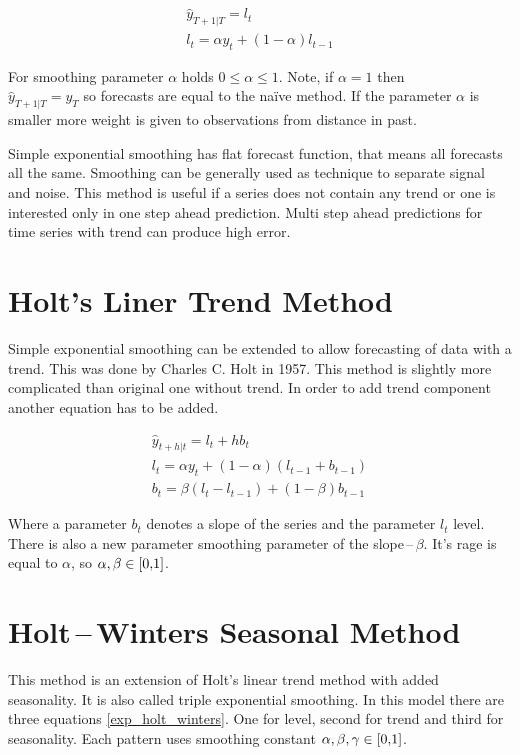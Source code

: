     \begin{eqnarray} \label{exp_smoothing}
         \hat{y}_{T+1|T} = l_t \\ \nonumber
         l_t = \alpha y_t + (1-\alpha)l_{t-1}
    \end{eqnarray}

    For smoothing parameter $\alpha$ holds $ 0 \leq \alpha \leq 1 $. Note, if $\alpha = 1$ then \\
    $\hat{y}_{T+1|T} = y_{T}$ so forecasts are equal to the na\"{i}ve method.
    If the parameter $\alpha $ is smaller more weight is given to observations from distance
    in past. 

    Simple exponential smoothing has flat forecast function, that means all forecasts
    all the same. Smoothing can be generally used as technique to separate signal and noise.
    This method is useful if a series does not contain any trend or one is interested only
    in one step ahead prediction. Multi step ahead predictions for time series with trend
    can produce high error.

    \section{Holt's Liner Trend Method}
    Simple exponential smoothing can be extended to allow forecasting of data with a trend. 
    This was done by Charles C. Holt in 1957. This method is slightly more complicated than 
    original one without trend. In order to add trend component another equation has to be added. 

    \begin{eqnarray} \label{exp_holt}
        \hat{y}_{t+h|t} = l_{t} + hb_{t} \\ \nonumber
         l_t = \alpha y_t + (1 - \alpha) (l_{t-1} + b_{t-1}) \\ \nonumber
         b_t = \beta (l_t - l_{t-1}) + (1 - \beta)b_{t-1} 
    \end{eqnarray}

    Where a parameter $b_t$ denotes a slope of the series and the parameter $l_t$ level. 
    There is also a new parameter smoothing parameter of the slope\,--\,$\beta$. 
    It's rage is equal to $\alpha$, so $\alpha,\beta \in \interval[{0,1}]$. 

    \section{Holt\,--\,Winters Seasonal Method}
    This method is an extension of Holt's linear trend method with added
    seasonality. It is also called triple exponential smoothing. In this model 
    there are three equations \ref{exp_holt_winters}. 
    One for level, second for trend and third for seasonality.
    Each pattern uses smoothing constant $ \alpha,\beta,\gamma \in \interval[{0,1}]$.

